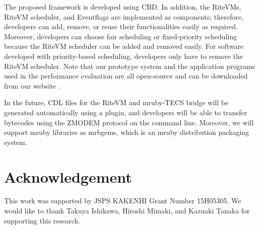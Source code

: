 \documentclass[S,R,E]{article/compsoft}
\begin{document}
The proposed framework is developed using CBD.
In addition, the RiteVMs, RiteVM scheduler, and Eventflags are implemented as components; therefore, developers can add, remove, or reuse their functionalities easily as required.
Moreover, developers can choose fair scheduling or fixed-priority scheduling because the RiteVM scheduler can be added and removed easily.
For software developed with priority-based scheduling, developers only have to remove the RiteVM scheduler.
Note that our prototype system and the application programs used in the performance evaluation are all open-source and can be downloaded from our website \cite{url:download}.

In the future, CDL files for the RiteVM and mruby-TECS bridge will be generated automatically using a plugin, and developers will be able to transfer bytecodes using the ZMODEM protocol on the command line.
Moreover, we will support mruby libraries as mrbgems, which is an mruby distribution packaging system.

\section{Acknowledgement}

This work was supported by JSPS KAKENHI Grant Number 15H05305.
We would like to thank Takuya Ishikawa, Hiroshi Mimaki, and Kazuaki Tanaka for supporting this research.







%
%
\end{document}
